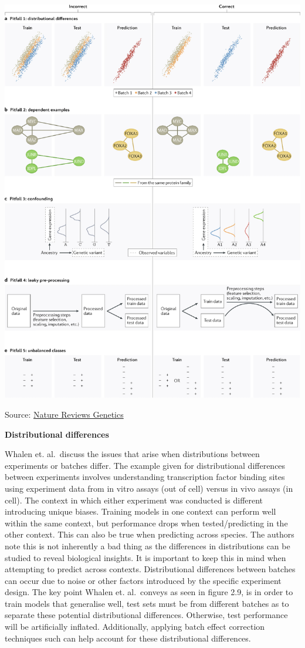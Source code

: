 \documentclass[
]{book}
\begin{document}
\includegraphics{images/pitfalls.png}

Source: \href{https://www.nature.com/articles/s41576-021-00434-9/figures/1}{Nature Reviews Genetics}

\textbf{Distributional differences}

Whalen et. al.~discuss the issues that arise when distributions between experiments or batches differ. The example given for distributional differences between experiments involves understanding transcription factor binding sites using experiment data from in vitro assays (out of cell) versus in vivo assays (in cell). The context in which either experiment was conducted is different introducing unique biases. Training models in one context can perform well within the same context, but performance drops when tested/predicting in the other context. This can also be true when predicting across species. The authors note this is not inherently a bad thing as the differences in distributions can be studied to reveal biological insights. It is important to keep this in mind when attempting to predict across contexts.
Distributional differences between batches can occur due to noise or other factors introduced by the specific experiment design. The key point Whalen et. al.~conveys as seen in figure 2.9, is in order to train models that generalise well, test sets must be from different batches as to separate these potential distributional differences. Otherwise, test performance will be artificially inflated. Additionally, applying batch effect correction techniques such can help account for these distributional differences.
\end{document}
